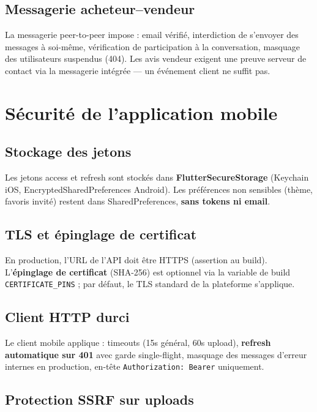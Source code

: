 \subsection{Messagerie acheteur--vendeur}

La messagerie peer-to-peer impose : email vérifié, interdiction de s'envoyer des messages à soi-même, vérification de participation à la conversation, masquage des utilisateurs suspendus (404). Les avis vendeur exigent une preuve serveur de contact via la messagerie intégrée --- un événement client ne suffit pas.

\section{Sécurité de l'application mobile}

\subsection{Stockage des jetons}

Les jetons access et refresh sont stockés dans \textbf{FlutterSecureStorage} (Keychain iOS, EncryptedSharedPreferences Android). Les préférences non sensibles (thème, favoris invité) restent dans SharedPreferences, \textbf{sans tokens ni email}.

\subsection{TLS et épinglage de certificat}

En production, l'URL de l'API doit être HTTPS (assertion au build). L'\textbf{épinglage de certificat} (SHA-256) est optionnel via la variable de build \texttt{CERTIFICATE\_PINS} ; par défaut, le TLS standard de la plateforme s'applique.

\subsection{Client HTTP durci}

Le client mobile applique : timeouts (15s général, 60s upload), \textbf{refresh automatique sur 401} avec garde single-flight, masquage des messages d'erreur internes en production, en-tête \texttt{Authorization: Bearer} uniquement.

\subsection{Protection SSRF sur uploads}

